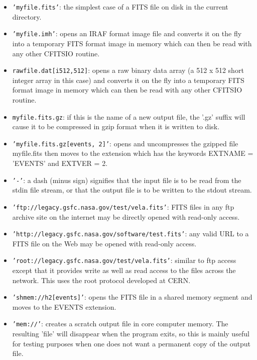 \documentclass[11pt]{book}
\begin{document}
\begin{itemize}
\item
{\tt 'myfile.fits'}: the simplest case of a FITS file on disk in the current
directory.

\item
{\tt 'myfile.imh'}: opens an IRAF format image file and converts it on the
fly into a temporary FITS format image in memory which can then be read with
any other CFITSIO routine.

\item
{\tt rawfile.dat[i512,512]}: opens a raw binary data array (a 512 x 512
short integer array in this case) and converts it on the fly into a
temporary FITS format image in memory which can then be read with any
other CFITSIO routine.

\item
{\tt myfile.fits.gz}: if this is the name of a new output file, the '.gz'
suffix will cause it to be compressed in gzip format when it is written to
disk.

\item
{\tt 'myfile.fits.gz[events, 2]'}:  opens and uncompresses the gzipped file
myfile.fits then moves to the extension which has the keywords EXTNAME
= 'EVENTS' and EXTVER = 2.

\item
{\tt '-'}:  a dash (minus sign) signifies that the input file is to be read
from the stdin file stream, or that the output file is to be written to
the stdout stream.

\item
{\tt 'ftp://legacy.gsfc.nasa.gov/test/vela.fits'}:  FITS files in any ftp
archive site on the internet may be directly opened with read-only
access.

\item
{\tt 'http://legacy.gsfc.nasa.gov/software/test.fits'}: any valid URL to a
FITS file on the Web may be opened with read-only access.

\item
{\tt 'root://legacy.gsfc.nasa.gov/test/vela.fits'}: similar to ftp access
except that it provides write as well as read access to the files
across the network. This uses the root protocol developed at CERN.

\item
{\tt 'shmem://h2[events]'}: opens the FITS file in a shared memory segment and
moves to the EVENTS extension.

\item
{\tt 'mem://'}:  creates a scratch output file in core computer memory.  The
resulting 'file' will disappear when the program exits, so this
is mainly useful for testing purposes when one does not want a
permanent copy of the output file.


\end{itemize}
\end{document}
